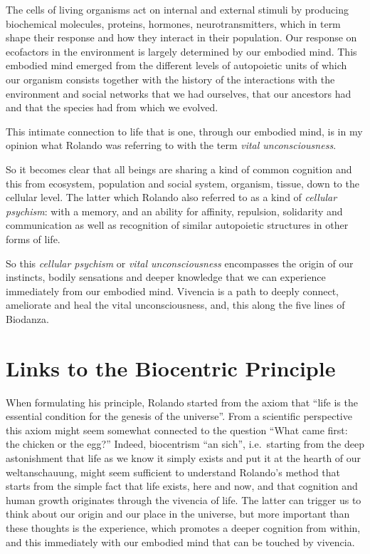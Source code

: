 \documentclass[
  11pt,
]{book}
\begin{document}
The cells of living organisms act on internal and external stimuli by producing biochemical molecules, proteins, hormones, neurotransmitters, which in term shape their response and how they interact in their population.
Our response on ecofactors in the environment is largely determined by our embodied mind. This embodied mind emerged from the different levels of autopoietic units of which our organism consists together with the history of the interactions with the environment and social networks that we had ourselves, that our ancestors had and that the species had from which we evolved.

This intimate connection to life that is one, through our embodied mind, is in my opinion what Rolando was referring to with the term \emph{vital unconsciousness}.

So it becomes clear that all beings are sharing a kind of common cognition and this from ecosystem, population and social system, organism, tissue, down to the cellular level. The latter which Rolando also referred to as a kind of \emph{cellular psychism}: with a memory, and an ability for affinity, repulsion, solidarity and communication as well as recognition of similar autopoietic structures in other forms of life.

So this \emph{cellular psychism} or \emph{vital unconsciousness} encompasses the origin of our instincts, bodily sensations and deeper knowledge that we can experience immediately from our embodied mind. Vivencia is a path to deeply connect, ameliorate and heal the vital unconsciousness, and, this along the five lines of Biodanza.

\hypertarget{links-to-the-biocentric-principle}{%
\section{Links to the Biocentric Principle}\label{links-to-the-biocentric-principle}}

When formulating his principle, Rolando started from the axiom that ``life is the essential condition for the genesis of the universe''. From a scientific perspective this axiom might seem somewhat connected to the question ``What came first: the chicken or the egg?'' Indeed, biocentrism ``an sich'', i.e.~starting from the deep astonishment that life as we know it simply exists and put it at the hearth of our weltanschauung, might seem sufficient to understand Rolando's method that starts from the simple fact that life exists, here and now, and that cognition and human growth originates through the vivencia of life. The latter can trigger us to think about our origin and our place in the universe, but more important than these thoughts is the experience, which promotes a deeper cognition from within, and this immediately with our embodied mind that can be touched by vivencia.
\end{document}
